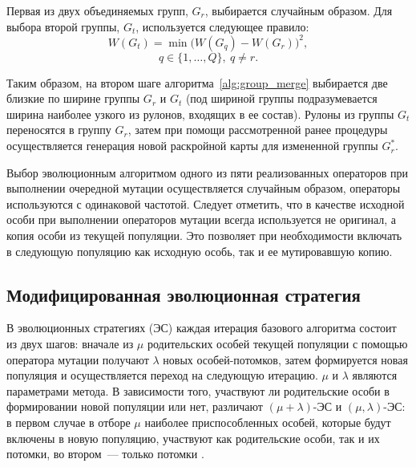 \documentclass[12pt]{article}
\begin{document}
Первая из двух объединяемых групп, $G_r$, выбирается случайным образом. 
Для выбора второй группы, $G_t$, используется следующее правило:
\[ W(G_t)=\min{\bigl( W(G_q) - W(G_r) \bigr)^2}, \]
\[ q \in \{1,\ldots,Q\}, \: q \neq r. \]

Таким образом, на втором шаге алгоритма~\ref{alg:group_merge}
выбирается две близкие по ширине группы $G_r$ и 
$G_t$ (под шириной группы подразумевается ширина наиболее узкого из рулонов, 
входящих в ее состав). Рулоны из группы $G_t$ переносятся в группу $G_r$, 
затем при помощи рассмотренной ранее процедуры осуществляется генерация новой 
раскройной карты для измененной группы $G_r^*$.

Выбор эволюционным алгоритмом одного из пяти реализованных операторов при 
выполнении очередной мутации осуществляется случайным образом, операторы 
используются с одинаковой частотой. Следует отметить, что в качестве исходной 
особи при выполнении операторов мутации всегда используется не оригинал, а 
копия особи из текущей популяции. Это позволяет при необходимости включать в 
следующую популяцию как исходную особь, так и ее мутировавшую копию.

\subsection{Модифицированная эволюционная стратегия}

В эволюционных стратегиях (ЭС) каждая итерация базового алгоритма состоит из 
двух шагов: вначале из $\mu$ родительских особей текущей популяции с помощью 
оператора мутации получают $\lambda$ новых особей-потомков, затем формируется 
новая популяция и осуществляется переход на следующую итерацию. $\mu$ и 
$\lambda$ являются параметрами метода. В зависимости того, участвуют ли 
родительские особи в формировании новой популяции или нет, различают 
$(\mu + \lambda)$-ЭС и $(\mu, \lambda)$-ЭС: в первом случае в отборе $\mu$ 
наиболее приспособленных особей, которые будут включены в новую популяцию, 
участвуют как родительские особи, так и их потомки, во втором~--- только 
потомки 
\cite{schwefel95}. 
\end{document}

